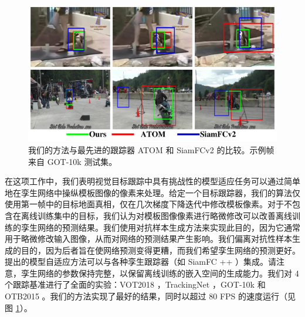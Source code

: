 \begin{figure}[t]
    \centering
    \includegraphics[width=1.0\textwidth]{Img/MTP/got10k/visulization2.pdf}
    \caption{我们的方法与最先进的跟踪器 ATOM \cite{danelljan2019atom} 和 SiamFCv2 \cite{SiamFC} 的比较。示例帧来自 GOT-10k \cite{GOT-10k} 测试集。}
    \label{fig:vis}
\end{figure}

在这项工作中，我们表明视觉目标跟踪中具有挑战性的模型适应任务可以通过简单地在孪生网络中操纵模板图像的像素来处理。给定一个目标跟踪器，我们的算法仅使用第一帧中的目标地面真相，仅在几次梯度下降迭代中修改模板像素。对于不包含在离线训练集中的目标，我们认为对模板图像像素进行略微修改可以改善离线训练的孪生网络的预测结果。我们使用对抗样本生成方法来实现此目的，因为它通常用于略微修改输入图像，从而对网络的预测结果产生影响。我们偏离对抗性样本生成的目的，因为后者旨在使网络预测变得更糟，而我们希望孪生网络的预测更好。提出的模型自适应方法可以与各种孪生跟踪器（如 SiamFC ++ \cite{SiamFC++}）集成。请注意，孪生网络的参数保持完整，以保留离线训练的嵌入空间的生成能力。我们对 4 个跟踪基准进行了全面的实验：VOT2018 \cite{kristan2018sixth}，TrackingNet \cite{muller2018trackingnet}，GOT-10k \cite{GOT-10k} 和 OTB2015 \cite{OTB}。我们的方法实现了最好的结果，同时以超过 80 FPS 的速度运行（见图 \ref{fig:vis}）。
